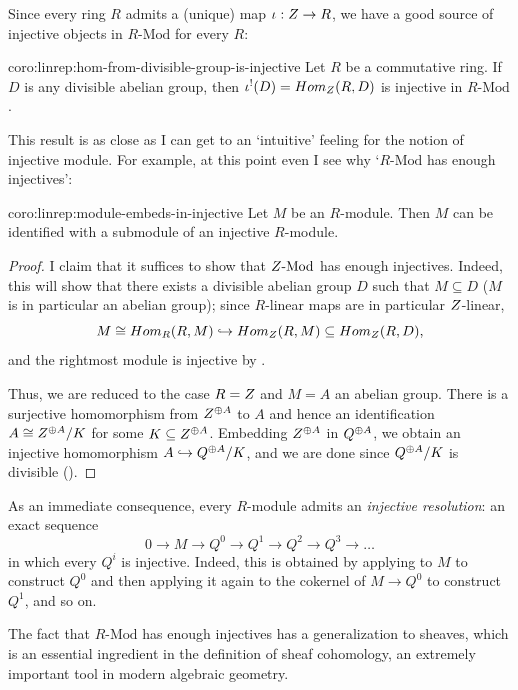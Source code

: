 Since every ring $R$ admits a (unique) map $\iota : Z \to R$, we have
a good source of injective objects in $R\text{-Mod}$ for every $R$:

\begin{coro}{}{coro:linrep:hom-from-divisible-group-is-injective}
  Let $R$ be a commutative ring. If $D$ is any divisible abelian
  group, then $\iota^!(D) = Hom_{Z}(R, D)$ is injective in
  $R\text{-Mod}$.
\end{coro}

This result is as close as I can get to an `intuitive' feeling for the
notion of injective module. For example, at this point even I see why
`$R\text{-Mod}$ has enough injectives':

\begin{coro}{}{coro:linrep:module-embeds-in-injective}
  Let $M$ be an $R$-module. Then $M$ can be identified with a
  submodule of an injective $R$-module.
\end{coro}

\begin{proof}
  I claim that it suffices to show that $Z\text{-Mod}$ has enough
  injectives. Indeed, this will show that there exists a divisible
  abelian group $D$ such that $M \subseteq D$ ($M$ is in particular an
  abelian group); since $R$-linear maps are in particular $Z$-linear,
  \[
    M \cong Hom_R(R, M) \hookrightarrow Hom_{Z}(R, M) \subseteq
    Hom_{Z}(R, D),
  \]
  and the rightmost module is injective by
  .

  Thus, we are reduced to the case $R = Z$ and $M = A$ an abelian
  group. There is a surjective homomorphism from $Z^{\oplus A}$ to
  $A$ and hence an identification $A \cong Z^{\oplus A}/K$ for some
  $K \subseteq Z^{\oplus A}$. Embedding $Z^{\oplus A}$ in
  $Q^{\oplus A}$, we obtain an injective homomorphism
  $A \hookrightarrow Q^{\oplus A}/K$, and we are done since
  $Q^{\oplus A}/K$ is divisible ().
\end{proof}

As an immediate consequence, every $R$-module admits an
\emph{injective resolution}: an exact sequence
\[
  0 \to M \to Q^0 \to Q^1 \to Q^2 \to Q^3 \to \dots
\]
in which every $Q^i$ is injective. Indeed, this is obtained by
applying  to $M$ to construct $Q^0$ and
then applying it again to the cokernel of $M \to Q^0$ to construct
$Q^1$, and so on.

The fact that $R\text{-Mod}$ has enough injectives has a
generalization to sheaves, which is an essential ingredient in the
definition of sheaf cohomology, an extremely important tool in modern
algebraic geometry.

